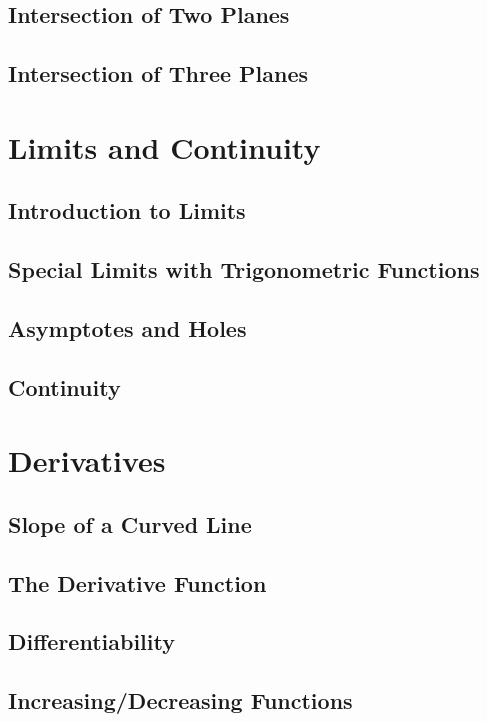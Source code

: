 \documentclass[12.5pt]{article}
\begin{document}
        \subsection{Intersection of Two Planes}
        \subsection{Intersection of Three Planes}
 
    \section{Limits and Continuity}
        \subsection{Introduction to Limits}
        \subsection{Special Limits with Trigonometric Functions}
        \subsection{Asymptotes and Holes}
        \subsection{Continuity}

    \clearpage

    \section{Derivatives}
        \subsection{Slope of a Curved Line}
        \subsection{The Derivative Function}
        \subsection{Differentiability}
        \subsection{Increasing/Decreasing Functions}
\end{document}

